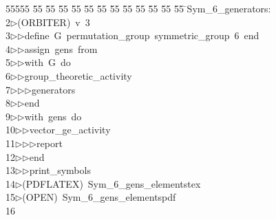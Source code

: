 %
%
\begin{tabbing}
55555 \= 55 \= 55 \= 55 \= 55 \= 55 \= 55 \= 55 \= 55 \= 55 \= 55 \= 55 \= 55 \= \>Sym\_6\_generators:\\[0pt]
2\>$\triangleright$\>(ORBITER)\ v\ 3\ \\[0pt]
3\>$\triangleright$\>$\triangleright$\>define\ G\ permutation\_group\ symmetric\_group\ 6\ end\ \\[0pt]
4\>$\triangleright$\>$\triangleright$\>assign\ gens\ from\ \\[0pt]
5\>$\triangleright$\>$\triangleright$\>with\ G\ do\ \\[0pt]
6\>$\triangleright$\>$\triangleright$\>group\_theoretic\_activity\ \\[0pt]
7\>$\triangleright$\>$\triangleright$\>$\triangleright$\>generators\ \\[0pt]
8\>$\triangleright$\>$\triangleright$\>end\ \\[0pt]
9\>$\triangleright$\>$\triangleright$\>with\ gens\ do\ \\[0pt]
10\>$\triangleright$\>$\triangleright$\>vector\_ge\_activity\ \\[0pt]
11\>$\triangleright$\>$\triangleright$\>$\triangleright$\>report\ \\[0pt]
12\>$\triangleright$\>$\triangleright$\>end\ \\[0pt]
13\>$\triangleright$\>$\triangleright$\>print\_symbols\\[0pt]
14\>$\triangleright$\>(PDFLATEX)\ Sym\_6\_gens\_elementstex\\[0pt]
15\>$\triangleright$\>(OPEN)\ Sym\_6\_gens\_elementspdf\\[0pt]
16\>\end{tabbing}
